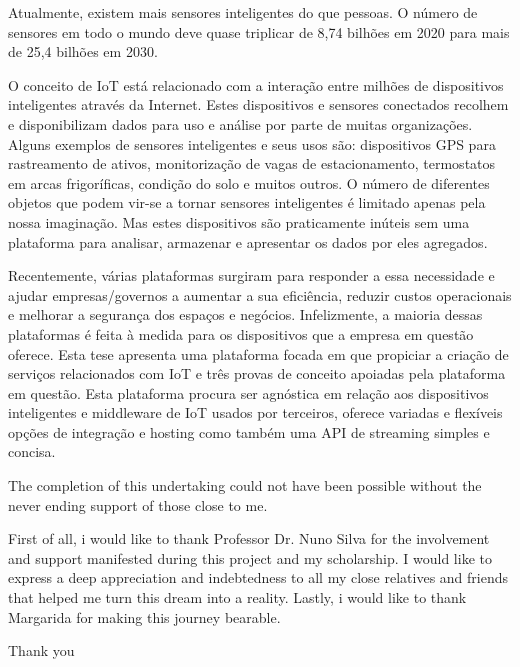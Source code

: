 \begin{abstractotherlanguage}

Atualmente, existem mais sensores inteligentes do que pessoas. O número de sensores em todo o mundo deve quase triplicar de 8,74 bilhões em 2020 para mais de 25,4 bilhões em 2030.

O conceito de \gls{IoT} está relacionado com a interação entre milhões de dispositivos inteligentes através da Internet. Estes dispositivos e sensores conectados recolhem e disponibilizam dados para uso e análise por parte de muitas organizações.
Alguns exemplos de sensores inteligentes e seus usos são: dispositivos GPS para rastreamento de ativos, monitorização de vagas de estacionamento, termostatos em arcas frigoríficas, condição do solo e muitos outros. O número de diferentes objetos que podem vir-se a tornar sensores inteligentes é limitado apenas pela nossa imaginação. Mas estes dispositivos são praticamente inúteis sem uma plataforma para analisar, armazenar e apresentar os dados por eles agregados.

Recentemente, várias plataformas surgiram para responder a essa necessidade e ajudar empresas/governos a aumentar a sua eficiência, reduzir custos operacionais e melhorar a segurança dos espaços e negócios. Infelizmente, a maioria dessas plataformas é feita à medida para os dispositivos que a empresa em questão oferece. Esta tese apresenta uma plataforma focada em que propiciar a criação de serviços relacionados com \gls{IoT} e três provas de conceito apoiadas pela plataforma em questão. Esta plataforma procura ser agnóstica em relação aos dispositivos inteligentes e middleware de \gls{IoT} usados por terceiros, oferece variadas e flexíveis opções de integração e hosting como também uma \gls{API} de streaming simples e concisa.

\end{abstractotherlanguage}


\begin{acknowledgements}
The completion of this undertaking could not have been possible without the never ending support of those close to me. 

First of all, i would like to thank Professor Dr. Nuno Silva for the involvement and support manifested during this project and my scholarship. 
I would like to express a deep appreciation and indebtedness to all my close relatives and friends that helped me turn this dream into a reality.
Lastly, i would like to thank Margarida for making this journey bearable.

Thank you
\end{acknowledgements}

